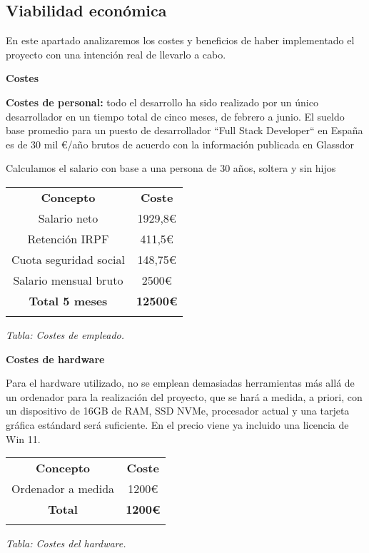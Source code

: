 \subsection{Viabilidad económica}

En este apartado analizaremos los costes y beneficios de haber implementado el proyecto con una intención real de llevarlo
a cabo.

\textbf{Costes}

\textbf{Costes de personal:} todo el desarrollo ha sido realizado por un único desarrollador en un tiempo total de cinco meses, de febrero
a junio.
El sueldo base promedio para un puesto de desarrollador ``Full Stack Developer`` en España es de 30 mil €/año brutos de acuerdo con
la información publicada en Glassdor\cite{glassdoorSueldo}


Calculamos el salario con base a una persona de 30 años, soltera y sin hijos\cite{seguridadSocial2025}

\begin{center}
\begin{tabular}{| c | c |}\hline
\Xhline{2\arrayrulewidth}
\textbf{Concepto} & \textbf{Coste} \\ \Xhline{2\arrayrulewidth}
Salario neto & 1929,8€ \\ \hline
Retención IRPF & 411,5€ \\ \hline
Cuota seguridad social & 148,75€ \\ \hline
Salario mensual bruto & 2500€ \\ \hline
\Xhline{2\arrayrulewidth}
\textbf{Total 5 meses} & \textbf{12500€} \\ \Xhline{2\arrayrulewidth}
\end{tabular}


\vspace{0.3em}
\textit{Tabla: Costes de empleado.}
\end{center}

\textbf{Costes de hardware}

Para el hardware utilizado, no se emplean demasiadas herramientas más allá de un ordenador para la realización del proyecto,
que se hará a medida, a priori, con un dispositivo de 16GB de RAM, SSD NVMe, procesador actual y una tarjeta gráfica estándard
será suficiente.
En el precio viene ya incluido una licencia de Win 11.


\begin{center}
    \begin{tabular}{| c | c |}\hline
    \Xhline{2\arrayrulewidth}
    \textbf{Concepto} & \textbf{Coste} \\ \Xhline{2\arrayrulewidth}
    Ordenador a medida & 1200€ \\ \hline
    \Xhline{2\arrayrulewidth}
    \textbf{Total} & \textbf{1200€} \\ \Xhline{2\arrayrulewidth}
    \end{tabular}


    \vspace{0.3em}
    \textit{Tabla: Costes del hardware.}
\end{center}

